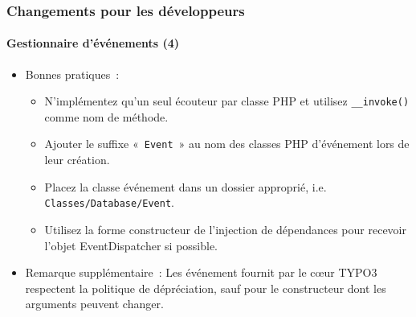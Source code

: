 
\begin{frame}[fragile]
	\frametitle{Changements pour les développeurs}
	\framesubtitle{Gestionnaire d'événements (4)}

	\lstset{basicstyle=\tiny\ttfamily}

	\begin{itemize}
		\item Bonnes pratiques~:

			\begin{itemize}
				\item N'implémentez qu'un seul écouteur par classe PHP et utilisez \texttt{\_\_invoke()}
					comme nom de méthode.
				\item Ajouter le suffixe «~\texttt{Event}~» au nom des classes PHP d'événement
					lors de leur création.
				\item Placez la classe événement dans un dossier approprié, i.e. \texttt{Classes/Database/Event}.
				\item Utilisez la forme constructeur de l'injection de dépendances pour recevoir
					l'objet EventDispatcher si possible.
			\end{itemize}

		\item Remarque supplémentaire~:\newline
			\small
				Les événement fournit par le cœur TYPO3 respectent la politique de dépréciation,
				sauf pour le constructeur dont les arguments peuvent changer.
			\normalsize

	\end{itemize}

\end{frame}


